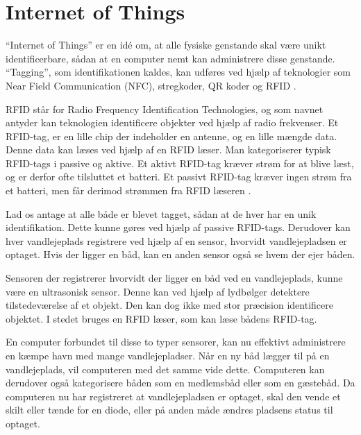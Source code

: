 \section{Internet of Things} %
\label{sec:internet_of_things}

\enquote{Internet of Things} er en idé om, at alle fysiske genstande skal være unikt identificerbare, sådan at en computer nemt kan administrere disse genstande. \enquote{Tagging}, som identifikationen kaldes, kan udføres ved hjælp af teknologier som Near Field Communication (NFC), stregkoder, QR koder og RFID \cite{iot2013}.

RFID står for Radio Frequency Identification Technologies, og som navnet antyder kan teknologien identificere objekter ved hjælp af radio frekvenser. Et RFID-tag, er en lille chip der indeholder en antenne, og en lille mængde data. Denne data kan læses ved hjælp af en RFID læser. Man kategoriserer typisk RFID-tags i passive og aktive. Et aktivt RFID-tag kræver strøm for at blive læst, og er derfor ofte tilsluttet et batteri. Et passivt RFID-tag kræver ingen strøm fra et batteri, men får derimod strømmen fra RFID læseren \cite{want2006rfid}.

Lad os antage at alle både er blevet tagget, sådan at de hver har en unik identifikation. Dette kunne gøres ved hjælp af passive RFID-tags. Derudover kan hver vandlejeplads registrere ved hjælp af en sensor, hvorvidt vandlejepladsen er optaget. Hvis der ligger en båd, kan en anden sensor også se hvem der ejer båden.

Sensoren der registrerer hvorvidt der ligger en båd ved en vandlejeplads, kunne være en ultrasonisk sensor. Denne kan ved hjælp af lydbølger detektere tilstedeværelse af et objekt. Den kan dog ikke med stor præcision identificere objektet. I stedet bruges en RFID læser, som kan læse bådens RFID-tag.

En computer forbundet til disse to typer sensorer, kan nu effektivt administrere en kæmpe havn med mange vandlejepladser. Når en ny båd lægger til på en vandlejeplads, vil computeren med det samme vide dette. Computeren kan derudover også kategorisere båden som en medlemsbåd eller som en gæstebåd. Da computeren nu har registreret at vandlejepladsen er optaget, skal den vende et skilt eller tænde for en diode, eller på anden måde ændres pladsens status til optaget.

